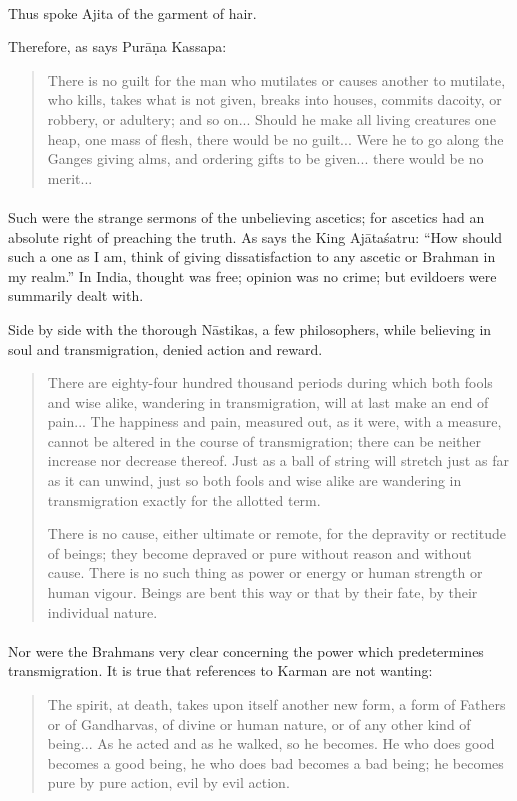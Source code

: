 \documentclass[a4paper, 11pt, oneside, english, landscape]{article}
\begin{document}
\paragraph{}
Thus spoke Ajita of the garment of hair.

Therefore, as says Purāṇa Kassapa:
\begin{quotation}
\small
There is no guilt for the man who mutilates or causes another to mutilate, who kills, takes what is not given, breaks into houses, commits dacoity, or robbery, or adultery; and so on... Should he make all living creatures one heap, one mass of flesh, there would be no guilt... Were he to go along the Ganges giving alms, and ordering gifts to be given... there would be no merit...
\end{quotation}
\paragraph{}
Such were the strange sermons of the unbelieving ascetics; for ascetics had an absolute right of preaching the truth. As says the King Ajātaśatru: ``How should such a one as I am, think of giving dissatisfaction to any ascetic or Brahman in my realm.'' In India, thought was free; opinion was no crime; but evildoers were summarily dealt with.

Side by side with the thorough Nāstikas, a few philosophers, while believing in soul and transmigration, denied action and reward.
\begin{quotation}
\small
There are eighty-four hundred thousand periods during which both fools and wise alike, wandering in transmigration, will at last make an end of pain... The happiness and pain, measured out, as it were, with a measure, cannot be altered in the course of transmigration; there can be neither increase nor decrease thereof. Just as a ball of string will stretch just as far as it can unwind, just so both fools and wise alike are wandering in transmigration exactly for the allotted term.

There is no cause, either ultimate or remote, for the depravity or rectitude of beings; they become depraved or pure without reason and without cause. There is no such thing as power or energy or human strength or human vigour. Beings are bent this way or that by their fate, by their individual nature.
\end{quotation}
\paragraph{}
Nor were the Brahmans very clear concerning the power which predetermines transmigration. It is true that references to Karman are not wanting:
\begin{quotation}
\small
The spirit, at death, takes upon itself another new form, a form of Fathers or of Gandharvas, of divine or human nature, or of any other kind of being... As he acted and as he walked, so he becomes. He who does good becomes a good being, he who does bad becomes a bad being; he becomes pure by pure action, evil by evil action.
\end{quotation}
\end{document}
